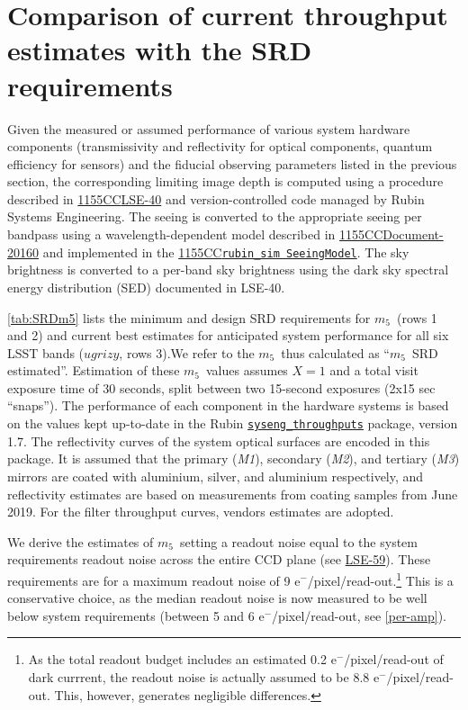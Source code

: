 \documentclass[PST,authoryear,toc]{lsstdoc}
\newcommand{\mf}{\ensuremath{m_5}}
\begin{document}
\section{Comparison of current throughput estimates with the SRD requirements \label{sec:SRD}}

Given the measured or assumed performance of various system hardware components (transmissivity and reflectivity 
for optical components, quantum efficiency for sensors) and the fiducial observing 
parameters listed in the previous section, the corresponding limiting image depth is computed using a procedure 
described in 
\href{https://docushare.lsst.org/docushare/dsweb/Get/LSE-40}{{1155CC}{LSE-40}}
and version-controlled code managed by Rubin Systems Engineering. The seeing is converted to the appropriate 
seeing per bandpass using a wavelength-dependent model described in 
\href{https://docushare.lsst.org/docushare/dsweb/Get/Document-20160}{{1155CC}{Document-20160}} 
and implemented in the 
\href{https://github.com/lsst/rubin_sim/blob/main/rubin_sim/site_models/seeingModel.py}{{1155CC}{\tt rubin\_sim SeeingModel}}. 
The sky brightness is converted to a per-band sky brightness using the dark sky spectral energy distribution (SED) documented in LSE-40.


\autoref{tab:SRDm5} lists the minimum and design SRD requirements for \mf\ (rows 1 and 2) and current best estimates for anticipated system performance for all six LSST bands ($ugrizy$, rows 3).We refer to the \mf\ thus calculated as  ``\mf\ SRD estimated''. Estimation of these \mf\ values assumes $X=1$ and a total visit exposure time of 30 seconds, split between two 15-second exposures (2x15 sec ``snaps''). The performance of each component in the hardware systems is based on the values kept up-to-date in the Rubin \href{https://github.com/lsst-pst/syseng_throughputs}{{\tt syseng\_throughputs}} package, version 1.7. {The  reflectivity curves of the system optical surfaces are encoded in this package. It is assumed that the primary ({\it M1}), secondary ({\it M2}), and tertiary ({\it M3}) mirrors are coated with aluminium, silver, and aluminium respectively, and reflectivity estimates are based on measurements from coating samples from June 2019. For the filter throughput curves, vendors estimates are adopted.}

We derive the estimates of \mf\ setting a readout noise equal to the system requirements readout noise across the entire CCD plane (see \href{https://docushare.lsst.org/docushare/dsweb/Get/LSE-59}{{LSE-59}}). These requirements are for a maximum readout noise of 9 e$^-$/pixel/read-out.\footnote{As the total readout budget includes an estimated 0.2  e$^-$/pixel/read-out of dark currrent, the readout noise is actually assumed to be 8.8  e$^-$/pixel/read-out. This, however, generates negligible differences.} This is a conservative choice, as the median readout noise is now measured to be well below system requirements (between 5 and 6  e$^-$/pixel/read-out, see \autoref{per-amp}).  
\end{document}
